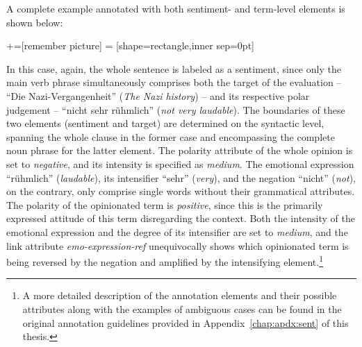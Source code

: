 A complete example annotated with both sentiment- and term-level
elements is shown below:
\begin{example}\label{snt:exmp:sent-anno2}
  +=[remember picture]
   = [shape=rectangle,inner sep=0pt]
  \upshape{}\\[2.2em]
  \noindent{}

\end{example}
In this case, again, the whole sentence is labeled as a sentiment,
since only the main verb phrase simultaneously comprises both the
target of the evaluation -- ``Die Nazi-Vergangenheit'' (\emph{The Nazi
  history}) -- and its respective polar judgement -- ``nicht sehr
r\"uhmlich'' (\emph{not very laudable}).  The boundaries of these two
elements (sentiment and target) are determined on the syntactic level,
spanning the whole clause in the former case and encompassing the
complete noun phrase for the latter element.  The polarity attribute
of the whole opinion is set to \emph{negative}, and its intensity is
specified as \emph{medium}.  The emotional expression ``r\"uhmlich''
(\emph{laudable}), its intensifier ``sehr'' (\emph{very}), and the
negation ``nicht'' (\emph{not}), on the contrary, only comprise single
words without their grammatical attributes.  The polarity of the
opinionated term is \emph{positive}, since this is the primarily
expressed attitude of this term disregarding the context.  Both the
intensity of the emotional expression and the degree of its
intensifier are set to \emph{medium}, and the link attribute
\emph{emo-expression-ref} unequivocally shows which opinionated term
is being reversed by the negation and amplified by the intensifying
element.\footnote{A more detailed description of the annotation
  elements and their possible attributes along with the examples of
  ambiguous cases can be found in the original annotation guidelines
  provided in Appendix~\ref{chap:apdx:sent} of this thesis.}

